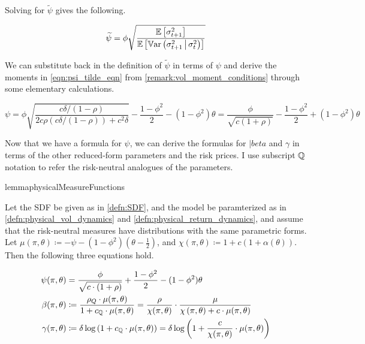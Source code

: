 \documentclass[11pt, letterpaper, twoside, final]{article}
\begin{document}
Solving for $\widetilde{\psi}$ gives the following.

\begin{equation}
    \label{eqn:psi_tilde_eqn}
    \widetilde{\psi} = \phi \sqrt{\frac{\operatorname{\mathbb{E}}\left[\sigma^2_{t+1} \right]}{\operatorname{\mathbb{E}}
    \left[\operatorname{\mathbb{V}ar}\left(\sigma^2_{t+1} \,\middle\vert\, \sigma^2_t\right)\right]}}  
\end{equation}

We can substitute back in the definition of $\tilde{\psi}$ in terms of $\psi$ and derive the moments in
\cref{eqn:psi_tilde_eqn} from \cref{remark:vol_moment_conditions} through some elementary calculations. 

\begin{equation}
    \label{eqn:psi_pp_as_func_of_params}
    \psi = \phi \sqrt{\frac{c \delta / (1 - \rho)}{2 c \rho \left(c \delta /
    (1 - \rho)\right) + c^2 \delta}} - \frac{1- \phi^2}{2} - (1 - \phi^2) \theta = \frac{\phi}{\sqrt{c
    (1 + \rho)}} - \frac{1 - \phi^2}{2}  + (1 - \phi^2) \theta
\end{equation}

Now that we have a formula for $\psi$, we can derive the formulas for $|beta$ and $\gamma$ in terms of the
other reduced-form parameters and the risk prices. 
I use subscript $\mathbb{Q}$ notation to refer the risk-neutral analogues of the parameters.

\begin{restatable}{lemma}{physicalMeasureFunctions}

    
    Let the SDF be given as in \cref{defn:SDF}, and the model be paramterized as in
    \cref{defn:physical_vol_dynamics} and \cref{defn:physical_return_dynamics}, and assume that the risk-neutral
    measures have distributions with the same parametric forms.
    Let $\mu(\pi, \theta) \coloneqq -\psi - (1-\phi^2)\left(\theta - \frac{1}{2}\right)$, and $\chi(\pi, \theta)
    \coloneqq 1 + c (1+ \alpha(\theta))$. 
    Then the following three equations hold.


    \begin{align}
        \label{eqn:psi_function}
        \psi(\pi, \theta) &= \frac{\phi}{\sqrt{c \cdot (1 + \rho)}} + \frac{1 - \phi^2}{2} - (1 - \phi^2)
        \theta  \\
%
        \label{eqn:beta_function}
        \beta(\pi, \theta) &\coloneqq \frac{\rho_{Q} \cdot \mu(\pi, \theta)}{1 + c_{\QQ} \cdot \mu(\pi, \theta)} =
        \frac{\rho}{\chi(\pi, \theta)} \cdot \frac{\mu}{\chi\left(\pi, \theta\right) + c \cdot \mu(\pi,
        \theta)}  \\
        \label{eqn:gamma_function}
        \gamma(\pi, \theta) &\coloneqq \delta \log\left(1 + c_{\QQ} \cdot \mu(\pi, \theta)\right) = \delta
        \log\left(1 + \frac{c}{\chi(\pi,\theta)} \cdot \mu(\pi,\theta) \right) 
    \end{align}

\end{restatable}
\end{document}

